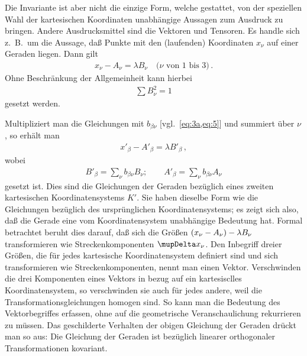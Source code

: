Die Invariante ist aber nicht die einzige Form, welche gestattet, von der 
speziellen Wahl der kartesischen Koordinaten unabhängige Aussagen zum Ausdruck
zu bringen. Andere Ausdrucksmittel sind die Vektoren und Tensoren. Es handle 
sich z.\ B.\ um die Aussage, daß Punkte mit den (laufenden) Koordinaten 
$x_{\nu}$ auf einer Geraden liegen. Dann gilt
\begin{align*}
x_{\nu} - A_{\nu} = \lambda B_{\nu}\quad \text{($\nu$ von $1$ bis $3$)}\, .
\end{align*}
Ohne Beschränkung der Allgemeinheit kann hierbei
\begin{align*}
\sum B_{\nu}^2 = 1
\end{align*}
gesetzt werden.

Multipliziert man die Gleichungen mit $b_{\beta\nu}$ [vgl.\ \cref{eq:3a,eq:5}] 
und summiert über $\nu$, so erhält man
\begin{align*}
x'_{\beta} - A'_{\beta} = \lambda B'_{\beta}\,,
\end{align*}
wobei
\begin{align*}
B'_{\beta} = \sum_{\nu} b_{\beta\nu} B_{\nu};\qquad
A'_{\beta} = \sum_{\nu} b_{\beta\nu} A_{\nu}
\end{align*}
gesetzt ist. Dies sind die Gleichungen der Geraden bezüglich eines zweiten 
kartesischen Koordinatensystems $K'$. Sie haben dieselbe Form wie die 
Gleichungen bezüglich des ursprünglichen Koordinatensystems; es zeigt sich 
also, daß die Gerade eine vom Koordinatensystem unabhängige Bedeutung hat. 
Formal betrachtet beruht dies darauf, daß sich die Größen ${\left(x_{\nu} - 
A_{\nu}\right)} - \lambda B_{\nu}$ transformieren wie Streckenkomponenten 
$\Dva x_{\nu}$. Den Inbegriff dreier Größen, die für jedes kartesische 
Koordinatensystem definiert sind und sich transformieren wie 
Streckenkomponenten, nennt man einen Vektor. Verschwinden die drei 
Komponenten eines Vektors in bezug auf ein kartesisclles Koordinatensystem, so 
verschwinden sie auch für jedes andere, weil die Transformationsgleichungen 
homogen sind. So kann man die Bedeutung des Vektorbegriffes erfassen, ohne auf 
die geometrische Veranschaulichung rekurrieren zu müssen. Das geschilderte 
Verhalten der obigen Gleichung der Geraden drückt man so aus: Die Gleichung 
der Geraden ist bezüglich linearer orthogonaler Transformationen kovariant.

